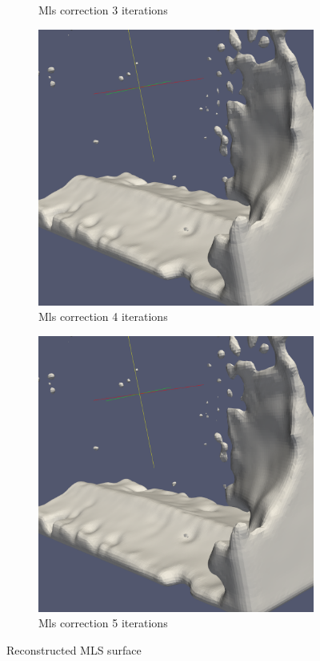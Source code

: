 \begin{figure}
\begin{center}
\begin{subfigure}[b]{0.47\textwidth}
			\caption{Mls correction 3 iterations}
		\end{subfigure}
		\begin{subfigure}[b]{0.47\textwidth}
			\includegraphics[width=\textwidth]{figures/MlsSurface4Iteration.png}
			\caption{Mls correction 4 iterations}
		\end{subfigure}
		\begin{subfigure}[b]{0.47\textwidth}
			\includegraphics[width=\textwidth]{figures/MlsSurface5Iteration.png}
			\caption{Mls correction 5 iterations}
		\end{subfigure}
	\end{center}
	\caption{Reconstructed MLS surface} \label{fig:mls_surf_iter_examples}
\end{figure}
